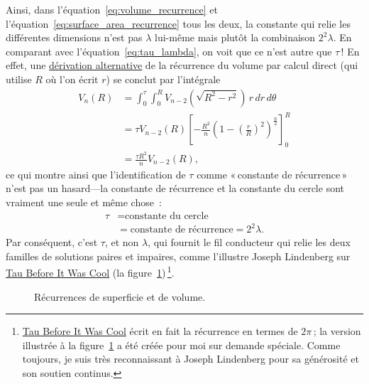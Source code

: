 Ainsi, dans l'équation~\eqref{eq:volume_recurrence} et l'équation~\eqref{eq:surface_area_recurrence} tous les deux, la constante qui relie les différentes dimensions n'est pas $\lambda$ lui-même mais plutôt la combinaison $2^2\lambda$. En comparant avec l'équation~\eqref{eq:tau_lambda}, on voit que ce n'est autre que $\tau$\,! En effet, une \href{https://en.wikipedia.org/wiki/Volume_of_an_n-ball#The_two-dimension_recursion_formula}{dérivation alternative} de la récurrence du volume par calcul direct (qui utilise $R$ où l'on écrit $r$) se conclut par l'intégrale
\begin{equation}
\label{eq:integral_recurrence}
\begin{split}
V_n(R) & = \int_0^\tau \int_0^R V_{n-2}\left(\sqrt{R^2 - r^2}\right) \,r\,dr\,d\theta \\
       & = \tau V_{n-2}(R) \left[-\frac{R^2}{n}\left(1 - \left(\frac{r}{R}\right)^2\right)^\frac{n}{2}\right]_{0}^{R} \\
       & = \frac{\tau R^2}{n} V_{n-2}(R),
\end{split}
\end{equation}
ce qui montre ainsi que l'identification de $\tau$ comme «\,constante de récurrence\,» n'est pas un hasard---la constante de récurrence et la constante du cercle sont vraiment une seule et même chose~:
\[
\begin{split}
\tau & = \mbox{constante du cercle} \\
     & = \mbox{constante de récurrence} = 2^2\lambda.
\end{split}
\]
Par conséquent, c'est $\tau$, et non $\lambda$, qui fournit le fil conducteur qui relie les deux familles de solutions paires et impaires, comme l'illustre Joseph Lindenberg sur \href{https://sites.google.com/site/taubeforeitwascool/}{Tau Before It Was Cool} (la figure~\ref{fig:Nspheres})\,\footnote{\href{https://sites.google.com/site/taubeforeitwascool/}{Tau Before It Was Cool} écrit en fait la récurrence en termes de $2\pi$\,; la version illustrée à la figure~\ref{fig:Nspheres} a été créée pour moi sur demande spéciale. Comme toujours, je suis très reconnaissant à Joseph Lindenberg pour sa générosité et son soutien continus.}.

\begin{figure}
\begin{center}
\end{center}
\caption{Récurrences de superficie et de volume.\label{fig:Nspheres}}
\end{figure}

